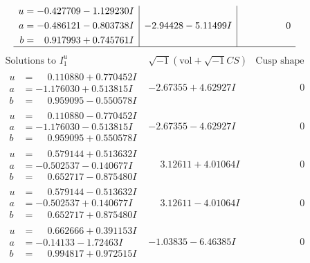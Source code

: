 \documentclass[1p]{elsarticle_modified}
\theoremstyle{definition}
\newcommand{\I}{\sqrt{-1}}
\begin{document}
$$\begin{array}{c|c|c}
\begin{aligned}
u &= -0.427709 - 1.129230 I \\
a &= -0.486121 - 0.803738 I \\
b &= \phantom{-}0.917993 + 0.745761 I\end{aligned}
 & -2.94428 - 5.11499 I & \phantom{-0.000000 } 0\\
 \hline 
 \end{array}$$\newpage$$\begin{array}{c|c|c}  
\text{Solutions to }I^u_{1}& \I (\text{vol} + \sqrt{-1}CS) & \text{Cusp shape}\\
 \hline 
\begin{aligned}
u &= \phantom{-}0.110880 + 0.770452 I \\
a &= -1.176030 + 0.513815 I \\
b &= \phantom{-}0.959095 - 0.550578 I\end{aligned}
 & -2.67355 + 4.62927 I & \phantom{-0.000000 } 0 \\ \hline\begin{aligned}
u &= \phantom{-}0.110880 - 0.770452 I \\
a &= -1.176030 - 0.513815 I \\
b &= \phantom{-}0.959095 + 0.550578 I\end{aligned}
 & -2.67355 - 4.62927 I & \phantom{-0.000000 } 0 \\ \hline\begin{aligned}
u &= \phantom{-}0.579144 + 0.513632 I \\
a &= -0.502537 - 0.140677 I \\
b &= \phantom{-}0.652717 - 0.875480 I\end{aligned}
 & \phantom{-}3.12611 + 4.01064 I & \phantom{-0.000000 } 0 \\ \hline\begin{aligned}
u &= \phantom{-}0.579144 - 0.513632 I \\
a &= -0.502537 + 0.140677 I \\
b &= \phantom{-}0.652717 + 0.875480 I\end{aligned}
 & \phantom{-}3.12611 - 4.01064 I & \phantom{-0.000000 } 0 \\ \hline\begin{aligned}
u &= \phantom{-}0.662666 + 0.391153 I \\
a &= -0.14133 - 1.72463 I \\
b &= \phantom{-}0.994817 + 0.972515 I\end{aligned}
 & -1.03835 - 6.46385 I & \phantom{-0.000000 } 0 \\ \hline\begin{aligned}

\end{aligned}
\end{array}$$
\end{document}
